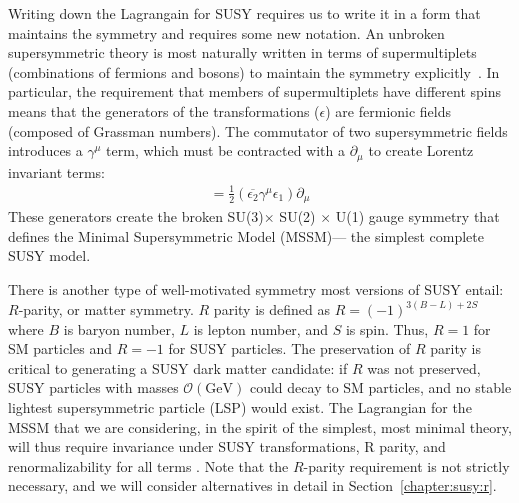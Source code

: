 Writing down the Lagrangain for SUSY requires us to write it in a form that maintains the symmetry and requires some new notation. An unbroken supersymmetric theory is most naturally written in terms of supermultiplets (combinations of fermions and bosons) to maintain the symmetry explicitly~\cite{Jungman}. In particular, the requirement that members of supermultiplets have different spins means that the generators of the transformations ($\epsilon$) are fermionic fields (composed of Grassman numbers). The commutator of two supersymmetric fields introduces a $\gamma^\mu$ term, which must be contracted with a $\partial_\mu$ to create Lorentz invariant terms:
\begin{align}
  [\delta(\epsilon_1),\delta(\epsilon_2)] = \frac{1}{2} \left( \overline{\epsilon_2} \gamma^\mu \epsilon_1\right)\partial_\mu
\end{align}
These generators create the broken SU(3)$\times$ SU(2) $\times$ U(1) gauge symmetry that defines the Minimal Supersymmetric Model (MSSM)--- the simplest complete SUSY model. 

There is another type of well-motivated symmetry most versions of SUSY entail: $R$-parity, or matter symmetry\cite{Jungman}. $R$ parity is defined as $R = (-1)^{3(B-L)+2S}$ where $B$ is baryon number, $L$ is lepton number, and $S$ is spin. Thus, $R = 1$ for SM particles and $R = -1$ for SUSY particles. The preservation of $R$ parity is critical to generating a SUSY dark matter candidate: if $R$ was not preserved, SUSY particles with masses $\mathcal{O}(\mathrm{GeV})$ could decay to SM particles, and no stable lightest supersymmetric particle (LSP) would exist. The Lagrangian for the MSSM that we are considering, in the spirit of the simplest, most minimal theory, will thus require invariance under SUSY transformations, R parity, and renormalizability for all terms \cite{Jungman}. Note that the $R$-parity requirement is not strictly necessary, and we will consider alternatives in detail in Section~\ref{chapter:susy:r}.


